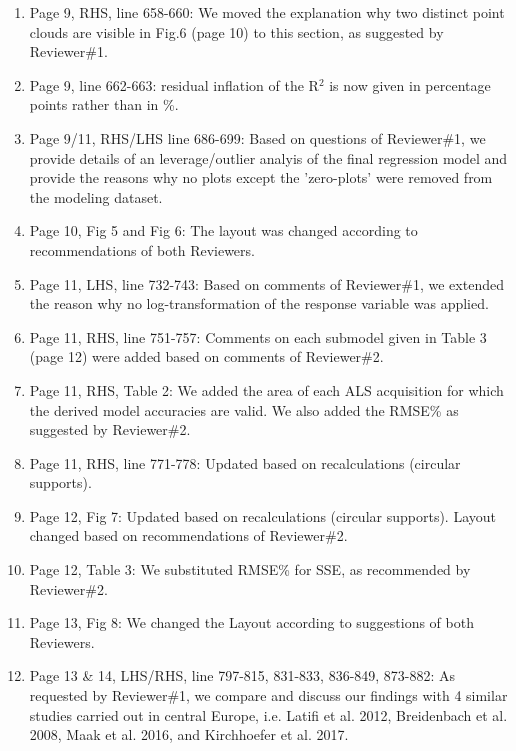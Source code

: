 \documentclass{article}
\begin{document}
\begin{enumerate}
	\item Page 9, RHS, line 658-660: We moved the explanation why two distinct point clouds are visible in Fig.6 (page 10) to this section, as suggested by Reviewer\#1.
	
	\item Page 9, line 662-663: residual inflation of the R$^2$ is now given in percentage points rather than in \%.
	
	\item Page 9/11, RHS/LHS line 686-699: Based on questions of Reviewer\#1, we provide details of an leverage/outlier analyis of the final regression model and provide the reasons why no plots except the 'zero-plots' were removed from the modeling dataset. 
	
	\item Page 10, Fig 5 and Fig 6: The layout was changed according to recommendations of both Reviewers. 
	
	\item Page 11, LHS, line 732-743: Based on comments of Reviewer\#1, we extended the reason why no log-transformation of the response variable was applied.
	
	\item Page 11, RHS, line 751-757: Comments on each submodel given in Table 3 (page 12) were added based on comments of Reviewer\#2.
	
	\item Page 11, RHS, Table 2: We added the area of each ALS acquisition for which the derived model accuracies are valid. We also added the RMSE\% as suggested by Reviewer\#2.
	
	\item Page 11, RHS, line 771-778: Updated based on recalculations (circular supports).
	
	\item Page 12, Fig 7:  Updated based on recalculations (circular supports). Layout changed based on recommendations of Reviewer\#2.
	
	\item Page 12, Table 3: We substituted RMSE\% for SSE, as recommended by Reviewer\#2.
	
	\item Page 13, Fig 8: We changed the Layout according to suggestions of both Reviewers.
	
	\item Page 13 \& 14, LHS/RHS, line 797-815, 831-833, 836-849, 873-882: As requested by Reviewer\#1, we compare and discuss our findings with 4 similar studies carried out in central Europe, i.e. Latifi et al. 2012, Breidenbach et al. 2008, Maak et al. 2016, and Kirchhoefer et al. 2017.
	

\end{enumerate}
\end{document}
